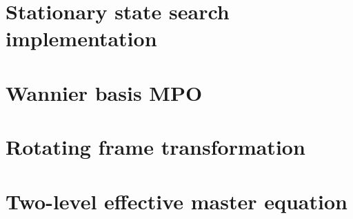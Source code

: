 \documentclass[a4paper,oneside,12pt]{hwthesis}
\newcommand*{\chappath}{../../include/chapters}
\newcommand*{\refpath}{../../include/refs}
\begin{document}
\appendix
\chapter{\label{chp:mpostat}Stationary state search implementation}



\chapter{\label{chp:dimmpo}Wannier basis MPO}



\chapter{\label{chp:rotframe}Rotating frame transformation}



\chapter{\label{chp:adelim}Two-level effective master equation}





\end{document}
